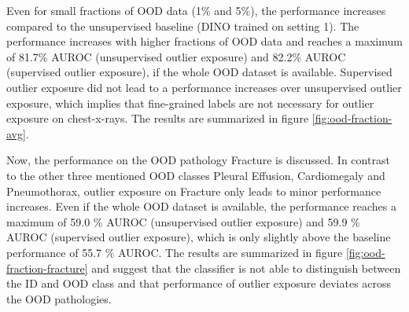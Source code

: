 \par
Even for small fractions of OOD data (1\% and 5\%), the performance increases compared to the unsupervised baseline (DINO trained on setting 1).
The performance increases with higher fractions of OOD data and reaches a maximum of 81.7\% AUROC (unsupervised outlier exposure) and 82.2\% AUROC (supervised outlier exposure), if the whole OOD dataset is available.
Supervised outlier exposure did not lead to a performance increases over unsupervised outlier exposure, which implies that fine-grained labels are not necessary for outlier exposure on chest-x-rays.
The results are summarized in figure \ref{fig:ood-fraction-avg}.
\par
Now, the performance on the OOD pathology Fracture is discussed.
In contrast to the other three mentioned OOD classes Pleural Effusion, Cardiomegaly and Pneumothorax, outlier exposure on Fracture only leads to minor performance increases.
Even if the whole OOD dataset is available, the performance reaches a maximum of 59.0 \% AUROC (unsupervised outlier exposure) and 59.9 \% AUROC (supervised outlier exposure), which is only slightly above the baseline performance of 55.7 \% AUROC.
The results are summarized in figure \ref{fig:ood-fraction-fracture} and suggest that the classifier is not able to distinguish between the ID and OOD class and that performance of outlier exposure deviates across the OOD pathologies.  
